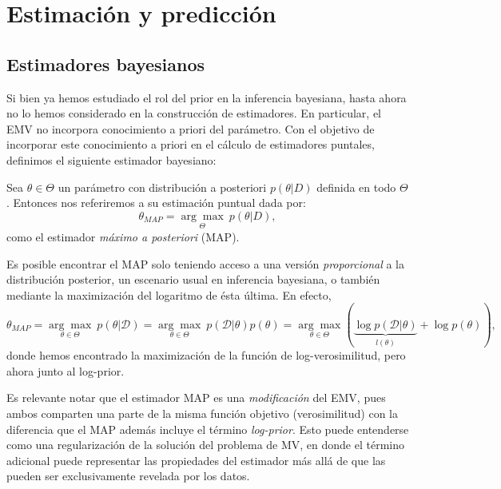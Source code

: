 \section{Estimación y predicción}

\subsection{Estimadores bayesianos}

Si bien ya hemos estudiado el rol del prior en la inferencia bayesiana, hasta ahora no lo hemos considerado en la construcción de estimadores. En particular, el EMV no incorpora conocimiento a priori del parámetro. Con el objetivo de incorporar este conocimiento a priori en el cálculo de estimadores puntales, definimos el siguiente estimador bayesiano: 

\begin{definition}
Sea $\theta \in \Theta$ un parámetro con distribución a posteriori $p(\theta |D)$ definida en todo $\Theta$. Entonces nos referiremos a su estimación puntual dada por: 
$$
\theta_{MAP}= \underset{\Theta}{\arg\max}\ p(\theta|D),
$$
como el estimador \emph{máximo a posteriori} (MAP). 
\end{definition}

\begin{remark}
Es posible encontrar el MAP solo teniendo acceso a una versión \emph{proporcional} a la distribución posterior, un escenario usual en inferencia bayesiana, o también mediante la maximización del logaritmo de ésta última. En efecto, 
$$
\theta_{MAP} = \underset{\theta \in \Theta}{\arg\max }\ p(\theta|\mathcal{D}) = \underset{\theta \in \Theta}{\arg\max }\ p(\mathcal{D}|\theta)p(\theta)= \underset{\theta \in \Theta}{\arg\max}\left(\underbrace{\log p(\mathcal{D}|\theta)}_{l(\theta)} + \log p(\theta)\right),
$$
donde hemos encontrado la maximización de  la función de log-verosimilitud, pero ahora junto al log-prior.
\end{remark}

\begin{remark}
Es relevante notar que el estimador MAP es una \emph{modificación} del EMV, pues ambos comparten una parte de la misma función objetivo (verosimilitud) con la diferencia que el MAP además incluye el término \emph{log-prior}. Esto puede entenderse como una regularización de la solución del problema de MV, en donde el término adicional puede representar las propiedades del estimador más allá de que las pueden ser exclusivamente revelada por los datos. 
\end{remark}

